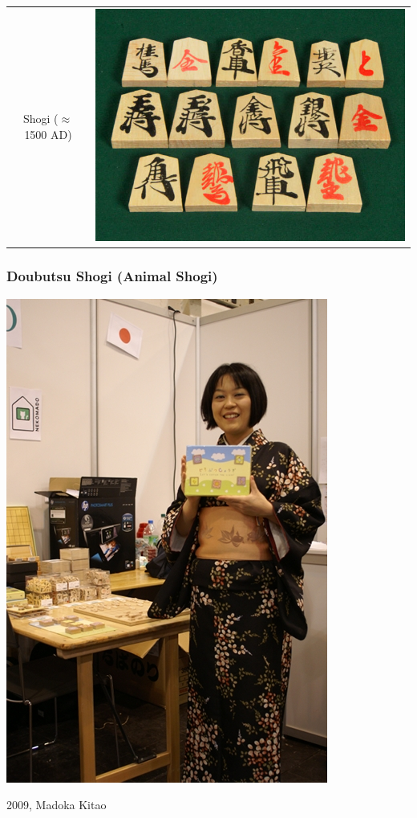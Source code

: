 \documentclass{beamer}
\begin{document}
\begin{frame}
\begin{tabular}{cc}
Shogi ($\approx$1500 AD) & \includegraphics[scale = 0.15]{shogi.jpg}
\end{tabular}
\end{frame}



\begin{frame}
\frametitle{Doubutsu Shogi (Animal Shogi)}
\begin{center}
\includegraphics[scale = 0.2]{Madokakitao.jpg}

2009, Madoka Kitao
\end{center}
\end{frame}
\end{document}
